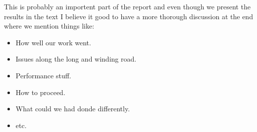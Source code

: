 This is probably an importent part of the report and even though we present the results in the text I believe it good to have a more thorough discussion at the end where we mention things like:

\begin{itemize}
\item How well our work went.
\item Issues along the long and winding road.
\item Performance stuff.
\item How to proceed.
\item What could we had donde differently.
\item etc.
\end{itemize}

